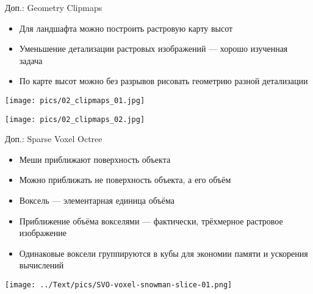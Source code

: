 \begin{frame}{Доп.: Geometry Clipmaps}
    \begin{minipage}{.5\textwidth}
        \begin{itemize}
            \item Для ландшафта можно построить растровую карту высот
            \item Уменьшение детализации растровых изображений --- хорошо изученная задача
            \item По карте высот можно без разрывов рисовать геометрию разной детализации
        \end{itemize}
    \end{minipage}
    \begin{minipage}{.45\textwidth}
        \texttt{[image: pics/02\_clipmaps\_01.jpg]}

        \texttt{[image: pics/02\_clipmaps\_02.jpg]}
    \end{minipage}
\end{frame}

\begin{frame}{Доп.: Sparse Voxel Octree}
    \centering
    \begin{minipage}{.75\textwidth}
        \begin{itemize}
            \item Меши приближают поверхность объекта
            \item Можно приближать не поверхность объекта, а его объём
            \item Воксель --- элементарная единица объёма
            \item Приближение объёма вокселями --- фактически, трёхмерное растровое изображение
            \item Одинаковые воксели группируются в кубы для экономии памяти и ускорения вычислений
        \end{itemize}
    \end{minipage}
    \begin{minipage}{.2\textwidth}
        \texttt{[image: ../Text/pics/SVO-voxel-snowman-slice-01.png]}
    \end{minipage}
\end{frame}

